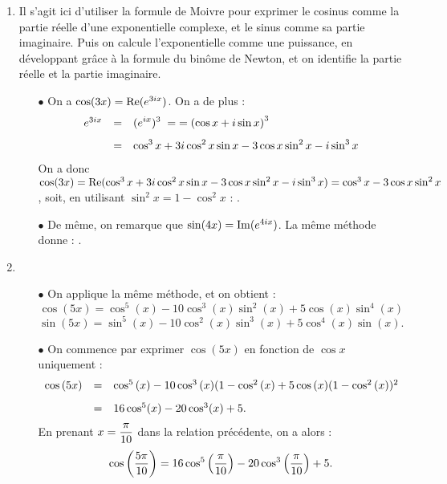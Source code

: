 \documentclass[a4paper, 11pt]{article}
\begin{document}
\begin{correction}   \;
\begin{enumerate}
\item Il s'agit ici d'utiliser la formule de Moivre pour exprimer le cosinus comme la partie r\'eelle d'une exponentielle complexe, et le sinus comme sa partie imaginaire. Puis on calcule l'exponentielle comme une puissance, en d\'eveloppant gr\^ace \`a la formule du bin\^ome de Newton, et on identifie la partie r\'eelle et la partie imaginaire.
\begin{itemize}
\item[$\bullet$] On a $\cos (3x) = \operatorname{Re}(e^{3ix})$. On a de plus :
$$\begin{array}{rcl}
e^{3ix} & = & \ddp (e^{ix})^3 \; = \; = \left(\cos x + i \sin x \right)^3\vsec\\
& = & \ddp \cos^3 x + 3 i \cos^2 x \sin x - 3 \cos x \sin^2 x - i \sin^3 x
\end{array}$$
On a donc $\cos (3x) = \operatorname{Re} (\cos^3 x + 3 i \cos^2 x \sin x - 3 \cos x \sin^2 x - i \sin^3 x) = \cos^3{x}-3\cos{x}\sin^2{x}$, soit, en utilisant $\sin^2 x =1-\cos^2 x$ : . 
\item[$\bullet$] De m\^eme, on remarque que $\sin(4x) = \operatorname{Im}(e^{4ix})$. La m\^eme m\'ethode donne : .
\end{itemize}
\item 
\begin{itemize}
\item[$\bullet$]  On applique la m\^eme m\'ethode, et on obtient :
$$\cos{(5x)} = \cos^5{(x)}-10\cos^3{(x)}\sin^2{(x)}+5\cos{(x)}\sin^4{(x)}$$
$$\sin{(5x)}= \sin^5{(x)} -10\cos^2{(x)}\sin^3{(x)}+5\cos^4{(x)}\sin{(x)}  .$$
\item[$\bullet$] On commence par exprimer $\cos{(5x)}$ en fonction de $\cos x$ uniquement :
$$\begin{array}{rcl}
\cos{(5x)} & = & \cos^5{(x)}-10\cos^3{(x)}(1-\cos^2{(x)}+5\cos{(x)}(1-\cos^2{(x)})^2 \vsec\\
 & = & 16 \cos^5 (x) - 20 \cos^3(x) + 5. 
 \end{array}$$
En prenant $x=\displaystyle\frac{\pi}{10}$ dans la relation pr\'ec\'edente, on a alors :
$$\cos{\left(\frac{5\pi}{10}\right)} = 16 \cos^5{\left( \displaystyle\frac{\pi}{10}\right)}-20\cos^3{\left( \displaystyle\frac{\pi}{10}\right)}+5.$$

\end{itemize}
\end{enumerate}
\end{correction}
\end{document}
